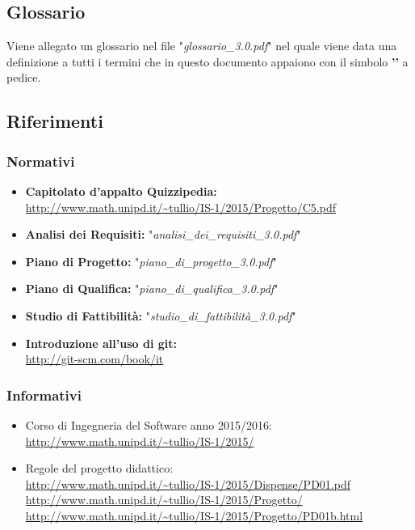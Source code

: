 \documentclass[a4paper,11pt]{article}
\begin{document}
		\subsection{Glossario}
			Viene allegato un glossario nel file "\textit{glossario\_3.0.pdf}" nel quale viene data una definizione a tutti i termini che in questo documento appaiono con il simbolo \textbf{'\addglos'}  a pedice.
		\subsection{Riferimenti}
			\subsubsection{Normativi}
				\begin{itemize}
					\item \textbf{Capitolato d'appalto Quizzipedia:}\\
					\url{http://www.math.unipd.it/~tullio/IS-1/2015/Progetto/C5.pdf}
					\item \textbf{Analisi dei Requisiti:} "\textit{analisi\_dei\_requisiti\_3.0.pdf}"
					\item \textbf{Piano di Progetto:} "\textit{piano\_di\_progetto\_3.0.pdf}"
					\item \textbf{Piano di Qualifica:} "\textit{piano\_di\_qualifica\_3.0.pdf}"
					\item \textbf{Studio di Fattibilità:} "\textit{studio\_di\_fattibilità\_3.0.pdf}"
					\item \textbf{Introduzione all'uso di git:} \\
					\url{http://git-scm.com/book/it} 
				\end{itemize}
			\subsubsection{Informativi}
				\begin{itemize}
					\item Corso di Ingegneria del Software anno 2015/2016:\\
					\url{http://www.math.unipd.it/~tullio/IS-1/2015/}
					\item Regole del progetto didattico:\\
					\url{http://www.math.unipd.it/~tullio/IS-1/2015/Dispense/PD01.pdf}
					\url{http://www.math.unipd.it/~tullio/IS-1/2015/Progetto/}\\
					\url{http://www.math.unipd.it/~tullio/IS-1/2015/Progetto/PD01b.html}
				\end{itemize}
	
\end{document}
